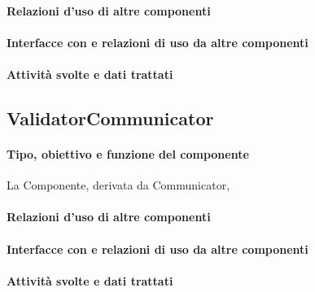 \documentclass[11pt,titlepage,a4paper]{report}
\begin{document}
\paragraph{Relazioni d'uso di altre componenti}
\paragraph{Interfacce con e relazioni di uso da altre componenti}
\paragraph{Attivit\`a svolte e dati trattati}

\subsection{ValidatorCommunicator}
\paragraph{Tipo, obiettivo e funzione del componente}
La Componente, derivata da Communicator,
\paragraph{Relazioni d'uso di altre componenti}
\paragraph{Interfacce con e relazioni di uso da altre componenti}
\paragraph{Attivit\`a svolte e dati trattati}
\end{document}
